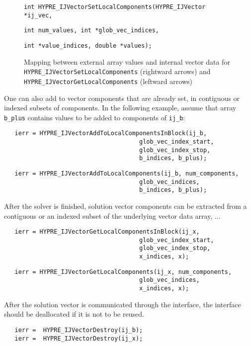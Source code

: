 \begin{figure}
\label{loc_comps}
\centerline{}
\parbox{6.5in}{\hspace{1in}
   {\tt int HYPRE\_IJVectorSetLocalComponents(HYPRE\_IJVector *ij\_vec,}}
\parbox{6.5in}{\hspace{2in}
   {\tt int num\_values, int *glob\_vec\_indices,}}
\parbox{6.5in}{\hspace{2in}
   {\tt int *value\_indices, double *values);}}
\caption{Mapping between external array values and
   internal vector data for
   {\tt HYPRE\_IJVectorSet\linebreak[0]LocalComponents}
   (rightward arrows) and
   {\tt HYPRE\_IJVectorGet\linebreak[0]LocalComponents}
   (leftward arrows)}
\end{figure}

One can also add to vector components that are already set, in
contiguous or indexed subsets of components.
In the following example,
assume that array \verb+b_plus+
contains values to be added to components of \verb+ij_b+:

\begin{verbatim}
   ierr = HYPRE_IJVectorAddToLocalComponentsInBlock(ij_b,
                                      glob_vec_index_start,
                                      glob_vec_index_stop,
                                      b_indices, b_plus); 
\end{verbatim}
\begin{verbatim}
   ierr = HYPRE_IJVectorAddToLocalComponents(ij_b, num_components,
                                      glob_vec_indices,
                                      b_indices, b_plus);
\end{verbatim}

\noindent After the solver is finished, solution vector components
can be extracted from a contiguous or an indexed subset of
the underlying vector data array, ...

\begin{verbatim}
   ierr = HYPRE_IJVectorGetLocalComponentsInBlock(ij_x,
                                      glob_vec_index_start,
                                      glob_vec_index_stop,
                                      x_indices, x);
\end{verbatim}
\begin{verbatim}
   ierr = HYPRE_IJVectorGetLocalComponents(ij_x, num_components,
                                      glob_vec_indices,
                                      x_indices, x);
\end{verbatim}

\noindent After the solution vector is communicated through the interface,
the interface should be deallocated if it is not to be reused.

\begin{verbatim}
   ierr =  HYPRE_IJVectorDestroy(ij_b);
   ierr =  HYPRE_IJVectorDestroy(ij_x);
\end{verbatim}



